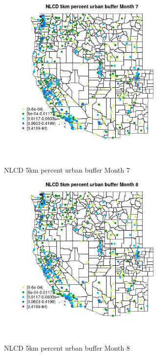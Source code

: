 \begin{figure} 
\centering  
\includegraphics[width=0.77\textwidth]{Code_Outputs/Report_ML_input_PM25_Step4_part_e_de_duplicated_aves_compiled_2019-05-14wNAs_MapObsMo7NLCD_5km_percent_urban_buffer.jpg} 
\caption{\label{fig:Report_ML_input_PM25_Step4_part_e_de_duplicated_aves_compiled_2019-05-14wNAsMapObsMo7NLCD_5km_percent_urban_buffer}NLCD 5km percent urban buffer Month 7} 
\end{figure} 
 

\begin{figure} 
\centering  
\includegraphics[width=0.77\textwidth]{Code_Outputs/Report_ML_input_PM25_Step4_part_e_de_duplicated_aves_compiled_2019-05-14wNAs_MapObsMo8NLCD_5km_percent_urban_buffer.jpg} 
\caption{\label{fig:Report_ML_input_PM25_Step4_part_e_de_duplicated_aves_compiled_2019-05-14wNAsMapObsMo8NLCD_5km_percent_urban_buffer}NLCD 5km percent urban buffer Month 8} 
\end{figure} 
 

